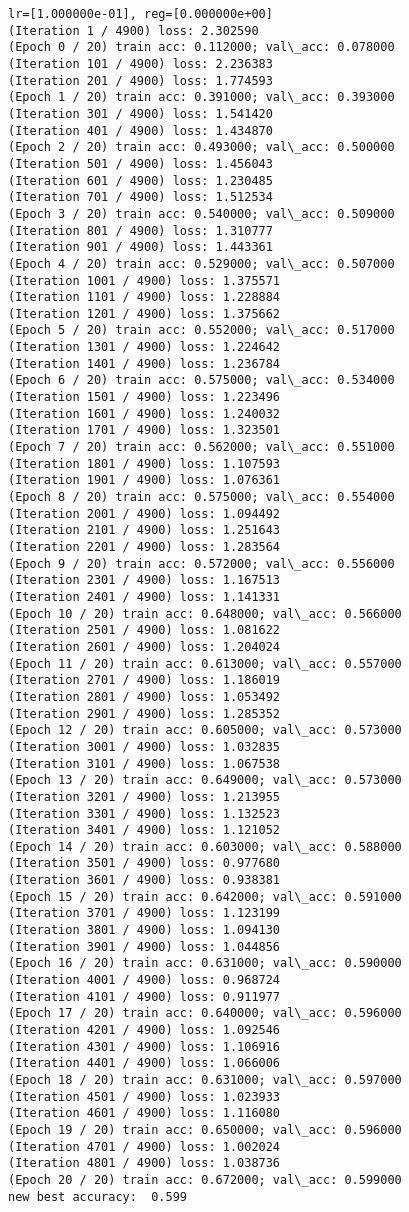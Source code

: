 \documentclass[11pt]{article}
\begin{document}
\begin{Verbatim}[commandchars=\\\{\}]
lr=[1.000000e-01], reg=[0.000000e+00]
(Iteration 1 / 4900) loss: 2.302590
(Epoch 0 / 20) train acc: 0.112000; val\_acc: 0.078000
(Iteration 101 / 4900) loss: 2.236383
(Iteration 201 / 4900) loss: 1.774593
(Epoch 1 / 20) train acc: 0.391000; val\_acc: 0.393000
(Iteration 301 / 4900) loss: 1.541420
(Iteration 401 / 4900) loss: 1.434870
(Epoch 2 / 20) train acc: 0.493000; val\_acc: 0.500000
(Iteration 501 / 4900) loss: 1.456043
(Iteration 601 / 4900) loss: 1.230485
(Iteration 701 / 4900) loss: 1.512534
(Epoch 3 / 20) train acc: 0.540000; val\_acc: 0.509000
(Iteration 801 / 4900) loss: 1.310777
(Iteration 901 / 4900) loss: 1.443361
(Epoch 4 / 20) train acc: 0.529000; val\_acc: 0.507000
(Iteration 1001 / 4900) loss: 1.375571
(Iteration 1101 / 4900) loss: 1.228884
(Iteration 1201 / 4900) loss: 1.375662
(Epoch 5 / 20) train acc: 0.552000; val\_acc: 0.517000
(Iteration 1301 / 4900) loss: 1.224642
(Iteration 1401 / 4900) loss: 1.236784
(Epoch 6 / 20) train acc: 0.575000; val\_acc: 0.534000
(Iteration 1501 / 4900) loss: 1.223496
(Iteration 1601 / 4900) loss: 1.240032
(Iteration 1701 / 4900) loss: 1.323501
(Epoch 7 / 20) train acc: 0.562000; val\_acc: 0.551000
(Iteration 1801 / 4900) loss: 1.107593
(Iteration 1901 / 4900) loss: 1.076361
(Epoch 8 / 20) train acc: 0.575000; val\_acc: 0.554000
(Iteration 2001 / 4900) loss: 1.094492
(Iteration 2101 / 4900) loss: 1.251643
(Iteration 2201 / 4900) loss: 1.283564
(Epoch 9 / 20) train acc: 0.572000; val\_acc: 0.556000
(Iteration 2301 / 4900) loss: 1.167513
(Iteration 2401 / 4900) loss: 1.141331
(Epoch 10 / 20) train acc: 0.648000; val\_acc: 0.566000
(Iteration 2501 / 4900) loss: 1.081622
(Iteration 2601 / 4900) loss: 1.204024
(Epoch 11 / 20) train acc: 0.613000; val\_acc: 0.557000
(Iteration 2701 / 4900) loss: 1.186019
(Iteration 2801 / 4900) loss: 1.053492
(Iteration 2901 / 4900) loss: 1.285352
(Epoch 12 / 20) train acc: 0.605000; val\_acc: 0.573000
(Iteration 3001 / 4900) loss: 1.032835
(Iteration 3101 / 4900) loss: 1.067538
(Epoch 13 / 20) train acc: 0.649000; val\_acc: 0.573000
(Iteration 3201 / 4900) loss: 1.213955
(Iteration 3301 / 4900) loss: 1.132523
(Iteration 3401 / 4900) loss: 1.121052
(Epoch 14 / 20) train acc: 0.603000; val\_acc: 0.588000
(Iteration 3501 / 4900) loss: 0.977680
(Iteration 3601 / 4900) loss: 0.938381
(Epoch 15 / 20) train acc: 0.642000; val\_acc: 0.591000
(Iteration 3701 / 4900) loss: 1.123199
(Iteration 3801 / 4900) loss: 1.094130
(Iteration 3901 / 4900) loss: 1.044856
(Epoch 16 / 20) train acc: 0.631000; val\_acc: 0.590000
(Iteration 4001 / 4900) loss: 0.968724
(Iteration 4101 / 4900) loss: 0.911977
(Epoch 17 / 20) train acc: 0.640000; val\_acc: 0.596000
(Iteration 4201 / 4900) loss: 1.092546
(Iteration 4301 / 4900) loss: 1.106916
(Iteration 4401 / 4900) loss: 1.066006
(Epoch 18 / 20) train acc: 0.631000; val\_acc: 0.597000
(Iteration 4501 / 4900) loss: 1.023933
(Iteration 4601 / 4900) loss: 1.116080
(Epoch 19 / 20) train acc: 0.650000; val\_acc: 0.596000
(Iteration 4701 / 4900) loss: 1.002024
(Iteration 4801 / 4900) loss: 1.038736
(Epoch 20 / 20) train acc: 0.672000; val\_acc: 0.599000
new best accuracy:  0.599


\end{Verbatim}
\end{document}
